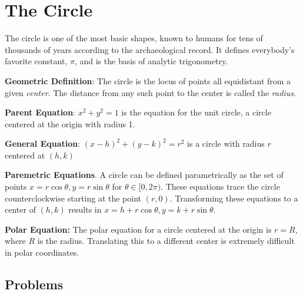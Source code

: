 \documentclass[
]{article}
\author{}
\date{}
\begin{document}
\hypertarget{the-circle}{%
\section{The Circle}\label{the-circle}}

The circle is one of the most basic shapes, known to humans for tens of
thousands of years according to the archaeological record. It defines
everybody's favorite constant, \(\pi\), and is the basis of analytic
trigonometry.

\textbf{Geometric Definition}: The circle is the locus of points all
equidistant from a given \emph{center}. The distance from any such point
to the center is called the \emph{radius}.

\textbf{Parent Equation}: \(x^2+y^2=1\) is the equation for the unit
circle, a circle centered at the origin with radius 1.

\textbf{General Equation}: \((x-h)^2 + (y-k)^2 = r^2\) is a circle with
radius \(r\) centered at \((h,k)\)

\textbf{Paremetric Equations}. A circle can be defined parametrically as
the set of points \(x = r \cos \theta, y = r \sin \theta\) for
\(\theta \in [0,2\pi)\). These equations trace the circle
counterclockwise starting at the point \((r,0).\) Transforming these
equations to a center of \((h,k)\) results in
\(x = h + r \cos \theta, y = k + r \sin \theta\).

\textbf{Polar Equation:} The polar equation for a circle centered at the
origin is \(r = R\), where \(R\) is the radius. Translating this to a
different center is extremely difficult in polar coordinates.

\hypertarget{problems}{%
\subsection{Problems}\label{problems}}
\end{document}
